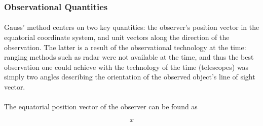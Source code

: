 \documentclass[11pt,twoside,letterpaper]{article}
\begin{document}
  \subsubsection {Observational Quantities}
  \paragraph{}
  Gauss' method centers on two key quantities: the observer's position
  vector in the equatorial coordinate system, and unit vectors along
  the direction of the observation. The latter is a result of the
  observational technology at the time: ranging methods such as radar
  were not available at the time, and thus the best observation one
  could achieve with the technology of the time (telescopes) was
  simply two angles describing the orientation of the observed
  object's line of sight vector. 

  \paragraph{}
  The equatorial position vector of the observer can be found as

  \[x\]
\end{document}
